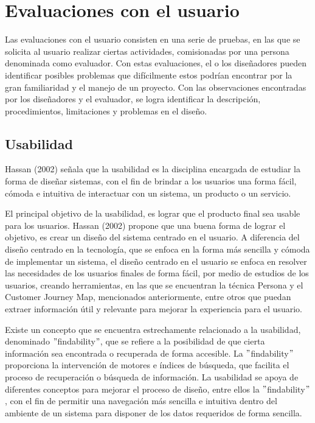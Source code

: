 \section{Evaluaciones con el usuario}
\label{EvaluacionesCap3}

Las evaluaciones con el usuario consisten en una serie de pruebas, en las que se solicita al usuario realizar ciertas actividades, comisionadas por una persona denominada como evaluador. Con estas evaluaciones, el o los diseñadores pueden identificar posibles problemas que difícilmente estos podrían encontrar por la gran familiaridad y el manejo de un proyecto. Con las observaciones encontradas por los diseñadores y el evaluador, se logra identificar la descripción, procedimientos, limitaciones y problemas en el diseño.


\subsection{Usabilidad}
\label{UsabilidadCap3}

Hassan (2002) señala que la usabilidad es la disciplina encargada de estudiar la forma de diseñar sistemas, con el fin de brindar a los usuarios una forma fácil, cómoda e intuitiva de interactuar con un sistema, un producto o un servicio.

El principal objetivo de la usabilidad, es lograr que el producto final sea usable para los usuarios. Hassan (2002) propone que una buena forma de lograr el objetivo, es crear un diseño del sistema centrado en el usuario. A diferencia del diseño centrado en la tecnología, que se enfoca en la forma más sencilla y cómoda de implementar un sistema, el diseño centrado en el usuario se enfoca en resolver las necesidades de los usuarios finales de forma fácil, por medio de estudios de los usuarios, creando herramientas, en las que se encuentran la técnica Persona y el Customer Journey Map, mencionados anteriormente, entre otros que puedan extraer información útil y relevante para mejorar la experiencia para el usuario.

Existe un concepto que se encuentra estrechamente relacionado a la usabilidad, denominado $"$findability$"$, que se refiere a la posibilidad de que cierta información sea encontrada o recuperada de forma accesible. La $"$findability$"$ proporciona la intervención de motores e índices de búsqueda, que facilita el proceso de recuperación o búsqueda de información. La usabilidad se apoya de diferentes conceptos para mejorar el proceso de diseño, entre ellos la $"$findability$"$, con el fin de permitir una navegación más sencilla e intuitiva dentro del ambiente de un sistema para disponer de los datos requeridos de forma sencilla.

